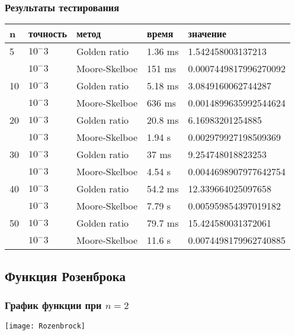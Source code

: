 \documentclass{article}
\begin{document}
    \subsubsection{Результаты тестирования}

    \begin{tabular}{ |p{2cm}|p{2cm}|p{3cm}|p{2cm}|p{4cm}|  }
        \hline
        n  & точность & метод         & время   & значение              \\
        \hline
        5  & $10^-3$  & Golden ratio  & 1.36 ms & 1.542458003137213     \\\cline{2-5}
        & $10^-3$  & Moore-Skelboe & 151 ms  & 0.0007449817996270092 \\
        \hline
        10 & $10^-3$  & Golden ratio  & 5.18 ms & 3.0849160062744287    \\\cline{2-5}
        & $10^-3$  & Moore-Skelboe & 636 ms  & 0.0014899635992544624 \\
        \hline
        20 & $10^-3$  & Golden ratio  & 20.8 ms & 6.16983201254885      \\\cline{2-5}
        & $10^-3$  & Moore-Skelboe & 1.94 s  & 0.002979927198509369  \\
        \hline
        30 & $10^-3$  & Golden ratio  & 37 ms   & 9.254748018823253     \\\cline{2-5}
        & $10^-3$  & Moore-Skelboe & 4.54 s  & 0.0044698907977642754 \\
        \hline
        40 & $10^-3$  & Golden ratio  & 54.2 ms & 12.339664025097658    \\\cline{2-5}
        & $10^-3$  & Moore-Skelboe & 7.79 s  & 0.005959854397019182  \\
        \hline
        50 & $10^-3$  & Golden ratio  & 79.7 ms & 15.424580031372061    \\\cline{2-5}
        & $10^-3$  & Moore-Skelboe & 11.6 s  & 0.0074498179962740885 \\
        \hline

    \end{tabular}

    \subsection{Функция Розенброка}

    \subsubsection{График функции при $n=2$}
    \texttt{[image: Rozenbrock]}
\end{document}
